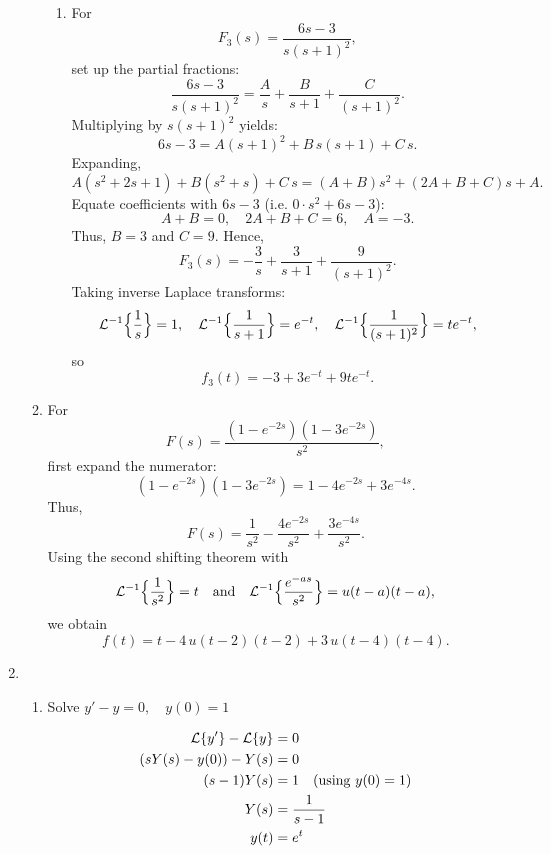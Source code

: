 \documentclass[12pt]{article}
\begin{document}
\begin{enumerate}
\begin{enumerate}
\begin{enumerate}
      \item For 
        \[
        F_3(s)=\frac{6s-3}{s(s+1)^2},
        \]
        set up the partial fractions:
        \[
        \frac{6s-3}{s(s+1)^2}
        =\frac{A}{s}+\frac{B}{s+1}+\frac{C}{(s+1)^2}.
        \]
        Multiplying by \(s(s+1)^2\) yields:
        \[
        6s-3=A(s+1)^2+B\,s(s+1)+C\,s.
        \]
        Expanding,
        \[
        A(s^2+2s+1)+B(s^2+s)+C\,s
        =(A+B)s^2+(2A+B+C)s+A.
        \]
        Equate coefficients with \(6s-3\) (i.e. \(0\cdot s^2+6s-3\)):
        \[
        A+B=0,\quad 2A+B+C=6,\quad A=-3.
        \]
        Thus, \(B=3\) and \(C=9\). Hence,
        \[
        F_3(s)=-\frac{3}{s}+\frac{3}{s+1}+\frac{9}{(s+1)^2}.
        \]
        Taking inverse Laplace transforms:
        \[
        \mathcal{L}^{-1}\Bigl\{\frac{1}{s}\Bigr\}=1,\quad
        \mathcal{L}^{-1}\Bigl\{\frac{1}{s+1}\Bigr\}=e^{-t},\quad
        \mathcal{L}^{-1}\Bigl\{\frac{1}{(s+1)^2}\Bigr\}=te^{-t},
        \]
        so
        \[
        f_3(t)=-3+3e^{-t}+9te^{-t}.
        \]
    \end{enumerate}

  \item
    For 
    \[
    F(s)=\frac{(1-e^{-2s})(1-3e^{-2s})}{s^2},
    \]
    first expand the numerator:
    \[
    (1-e^{-2s})(1-3e^{-2s})=1-4e^{-2s}+3e^{-4s}.
    \]
    Thus,
    \[
    F(s)=\frac{1}{s^2}-\frac{4e^{-2s}}{s^2}+\frac{3e^{-4s}}{s^2}.
    \]
    Using the second shifting theorem with
    \[
    \mathcal{L}^{-1}\Bigl\{\frac{1}{s^2}\Bigr\}=t \quad \text{and} \quad \mathcal{L}^{-1}\Bigl\{\frac{e^{-as}}{s^2}\Bigr\}=u(t-a)(t-a),
    \]
    we obtain
    \[
    f(t)=t-4\,u(t-2)(t-2)+3\,u(t-4)(t-4).
    \]
\end{enumerate}

\item 
\begin{enumerate}

    \item Solve \( y' - y = 0, \quad y(0) = 1 \)
    
    \begin{align*}
        \mathcal{L} \{ y' \} - \mathcal{L} \{ y \} &= 0 \\
        (sY(s) - y(0)) - Y(s) &= 0 \\
        (s - 1) Y(s) &= 1 \quad \text{(using \( y(0) = 1 \))} \\
        Y(s) &= \frac{1}{s - 1} \\
        y(t) &= e^t
    \end{align*}


\end{enumerate}
\end{enumerate}
\end{document}
